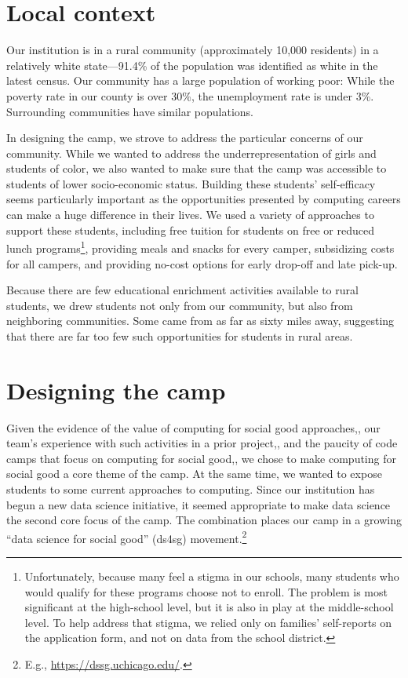 \section{Local context}

Our institution is in a rural community (approximately 10,000
residents) in a relatively white state---91.4\% of the population was
identified as white in the latest census.  Our community has a large
population of working poor: While the poverty rate in our county
is over 30\%, the unemployment rate is under 3\%.  Surrounding
communities have similar populations.

In designing the camp, we strove to address the particular concerns
of our community.  While we wanted to address the underrepresentation
of girls and students of color, we also wanted to make sure that
the camp was accessible to students of lower socio-economic status.
Building these students' self-efficacy seems particularly important
as the opportunities presented by computing careers can make a huge
difference in their lives.  We used a variety of approaches to
support these students, including free tuition for students on free
or reduced lunch programs\footnote{Unfortunately, because many feel
a stigma in our schools, many students who would qualify for these
programs choose not to enroll.  The problem is most significant at
the high-school level, but it is also in play at the
middle-school level.  To help address that stigma, we relied only
on families' self-reports on the application form, and not on data
from the school district.}, providing meals and snacks for every
camper, subsidizing costs for all campers, and providing no-cost
options for early drop-off and late pick-up.

Because there are few educational enrichment activities available
to rural students, we drew students not only from our community,
but also from neighboring communities.  Some came from as far as
sixty miles away, suggesting that there are far too few such
opportunities for students in rural areas.

\section{Designing the camp}

Given the evidence of the value of computing for social good
approaches,\cite{Goldweber2013,Goldweber2018}, our team's experience
with such activities in a prior project,\cite{arts-coding}, and the
paucity of code camps that focus on computing for social
good,\cite{DeWitt2017}, we chose to make
computing for social good a core theme of the camp.  At the same
time, we wanted to expose students to some current approaches to
computing.  Since our institution has begun a new data science
initiative, it seemed appropriate to make data science the second
core focus of the camp.  The combination places our camp in a growing
``data science for social good'' (ds4sg) movement.\footnote{E.g.,
\url{https://dssg.uchicago.edu/}.}


